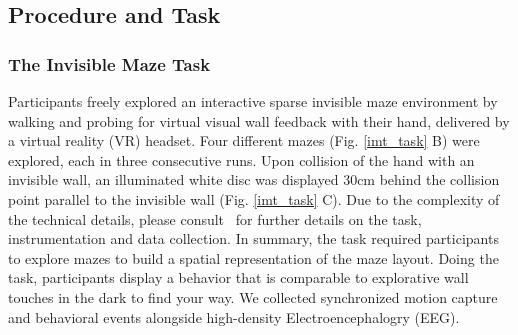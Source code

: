\subsection{Procedure and Task}
\subsubsection{The Invisible Maze Task} Participants freely explored an interactive sparse invisible maze environment by walking and probing for virtual visual wall feedback with their hand, delivered by a virtual reality (VR) headset. Four different mazes (Fig. \ref{imt_task} B) were explored, each in three consecutive runs. Upon collision of the hand with an invisible wall, an illuminated white disc was displayed 30cm behind the collision point parallel to the invisible wall (Fig. \ref{imt_task} C). Due to the complexity of the technical details, please consult~\cite{Gehrke2018} for further details on the task, instrumentation and data collection. In summary, the task required participants to explore mazes to build a spatial representation of the maze layout. Doing the task, participants display a behavior that is comparable to explorative wall touches in the dark to find your way. We collected synchronized motion capture and behavioral events alongside high-density Electroencephalogry (EEG).